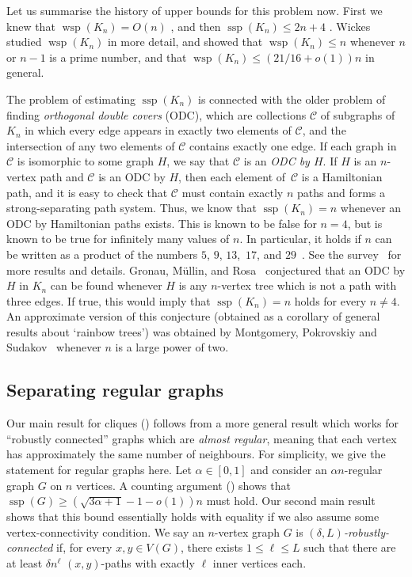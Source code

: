 \documentclass[a4paper, 11pt,reqno]{amsart}
\theoremstyle{plain}
\theoremstyle{definition}
\numberwithin{equation}{section}
\DeclareMathOperator{\wsp}{wsp}
\DeclareMathOperator{\ssp}{ssp}
\begin{document}
Let us summarise the history of upper bounds for this problem now.
First we knew that $\wsp(K_n) = O(n)$ \cite[Theorem
1.3]{FKKLN2014}, and then $\ssp(K_n) \leq 2n+4$ \cite[Theorem
3]{BCMP2016}.  Wickes~\cite{Wickes2022} studied $\wsp(K_n)$ in more
detail, and showed that $\wsp(K_n) \leq n$ whenever $n$ or $n-1$ is a
prime number, and that $\wsp(K_n) \leq (21/16 + o(1))n$ in general.

The problem of estimating $\ssp(K_n)$ is connected with the older
problem of finding \emph{orthogonal double covers} (ODC), which are
collections $\mathcal{C}$ of subgraphs of~$K_n$ in which every edge
appears in exactly two elements of $\mathcal{C}$, and the intersection
of any two elements of $\mathcal{C}$ contains exactly one edge.
If each graph in $\mathcal{C}$ is isomorphic to some graph $H$, we say that $\mathcal{C}$ is an \emph{ODC by $H$}.
If $H$ is an $n$-vertex path and $\mathcal{C}$ is an ODC by $H$, then each element of~$\mathcal{C}$ is a Hamiltonian path, and it is easy
to check that $\mathcal{C}$ must contain exactly $n$ paths and forms a strong-separating path system. 
Thus, we know that $\ssp(K_n) = n$ whenever an ODC by Hamiltonian paths exists.  
This is known to be false for $n = 4$, but is known to be true for infinitely 
many values of $n$.  In particular, it holds if $n$ can be written as a
product of the numbers $5$, $9$, $13$,~$17$, and $29$~\cite{HortonNonay1991}.
See %
the survey~\cite{GGHLL2002} for more results and details.  
Gronau,
Müllin, and Rosa~\cite{GronauMullinRosa1997} conjectured that an ODC by $H$
in $K_n$ can be found whenever $H$ is any $n$-vertex tree which is not a path with three
edges. If true, this would imply that $\ssp(K_n) = n$ holds for every
$n \neq 4$.  An approximate version of this conjecture (obtained as a
corollary of general results about `rainbow trees') was obtained by
Montgomery, Pokrovskiy and Sudakov~\cite[Theorem~1.7]{MontgomeryPokrovskiySudakov2020} 
whenever $n$ is a large power of two.

\subsection{Separating regular graphs}
Our main result for cliques () follows
from a more general result which works for ``robustly connected''
graphs which are \emph{almost regular}, meaning that each vertex has
approximately the same number of neighbours.  For simplicity, we give
the statement for regular graphs here.  Let $\alpha \in [0,1]$ and
consider an $\alpha n$-regular graph $G$ on $n$ vertices.  A counting
argument () shows that $\ssp(G)
\geq (\sqrt{3 \alpha + 1} - 1 - o(1))n$ must hold.  Our second main
result shows that this bound essentially holds with equality if we
also assume some vertex-connectivity condition. We say an $n$-vertex
graph $G$ is \emph{$(\delta, L)$-robustly-connected} if, for every $x,
y \in V(G)$, there exists $1 \leq \ell \leq L$ such that there are at
least $\delta n^\ell$ $(x,y)$-paths with exactly $\ell$ inner vertices
each.
\end{document}
